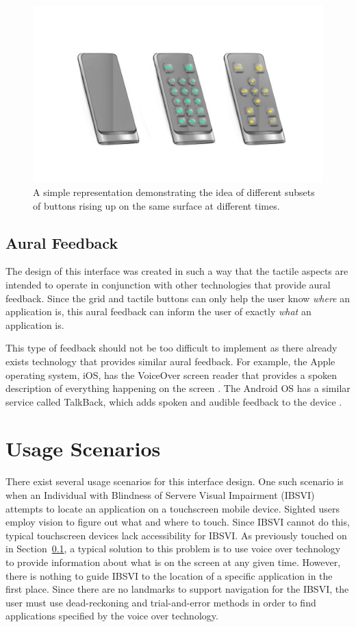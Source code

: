 \documentclass[11pt]{article}
\begin{document}
\begin{figure}[ht]
\centering
\includegraphics[width=6in]{buttons.jpg}
\caption{A simple representation demonstrating the idea of different subsets of buttons rising up on the same surface at different times.}
\label{buttons}
\end{figure}

\subsection{Aural Feedback}
\label{aural-feedback}
The design of this interface was created in such a way that the tactile aspects are intended to operate in conjunction with other technologies that provide aural feedback. Since the grid and tactile buttons can only help the user know \textit{where} an application is, this aural feedback can inform the user of exactly \textit{what} an application is.

This type of feedback should not be too difficult to implement as there already exists technology that provides similar aural feedback. For example, the Apple operating system, iOS, has the VoiceOver screen reader that provides a spoken description of everything happening on the screen \cite{VoiceOver}. The Android OS has a similar service called TalkBack, which adds spoken and audible feedback to the device \cite{TalkBack}.


\section{Usage Scenarios}
There exist several usage scenarios for this interface design. One such scenario is when an Individual with Blindness of Servere Visual Impairment (IBSVI) attempts to locate an application on a touchscreen mobile device. Sighted users employ vision to figure out what and where to touch. Since IBSVI cannot do this, typical touchscreen devices lack accessibility for IBSVI. As previously touched on in Section~\ref{aural-feedback}, a typical solution to this problem is to use voice over technology to provide information about what is on the screen at any given time. However, there is nothing to guide IBSVI to the location of a specific application in the first place. Since there are no landmarks to support navigation for the IBSVI, the user must use dead-reckoning and trial-and-error methods in order to find applications specified by the voice over technology. 
\end{document}
